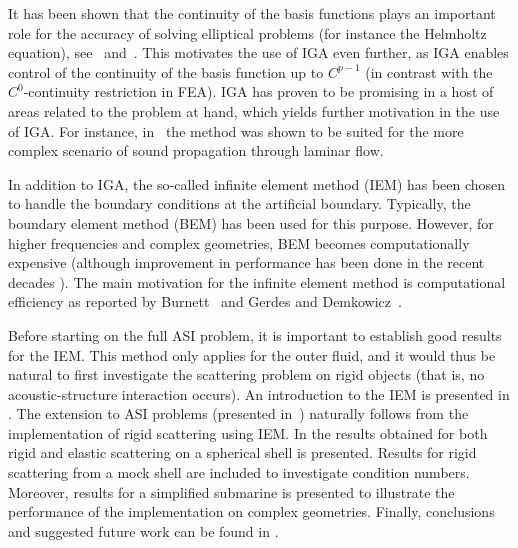 It has been shown that the continuity of the basis functions plays an important role for the accuracy of solving elliptical problems (for instance the Helmholtz equation), see~\cite{BeiraodaVeiga2011sef} and~\cite{BeiraodaVeiga2014mao}. This motivates the use of IGA even further, as IGA enables control of the continuity of the basis function up to $C^{p-1}$ (in contrast with the $C^0$-continuity restriction in FEA). IGA has proven to be promising in a host of areas related to the problem at hand, which yields further motivation in the use of IGA. For instance, in~\cite{nortoft2015iao} the method was shown to be suited for the more complex scenario of sound propagation through laminar flow.

In addition to IGA, the so-called infinite element method (IEM) has been chosen to handle the boundary conditions at the artificial boundary. Typically, the boundary element method (BEM) \cite{Sauter2011bem,Schanz2007bea} has been used for this purpose. However, for higher frequencies and complex geometries, BEM becomes computationally expensive (although improvement in performance has been done in the recent decades \cite{Liu2012raa}). The main motivation for the infinite element method is computational efficiency as reported by Burnett~\cite{Burnett1994atd} and Gerdes and Demkowicz~\cite{Gerdes1996so3}.

Before starting on the full ASI problem, it is important to establish good results for the IEM. This method only applies for the outer fluid, and it would thus be natural to first investigate the scattering problem on rigid objects (that is, no acoustic-structure interaction occurs). An introduction to the IEM is presented in . The extension to ASI problems (presented in~) naturally follows from the implementation of rigid scattering using IEM. In  the results obtained for both rigid and elastic scattering on a spherical shell is presented. Results for rigid scattering from a mock shell are included to investigate condition numbers. Moreover, results for a simplified submarine is presented to illustrate the performance of the implementation on complex geometries. Finally, conclusions and suggested future work can be found in . 